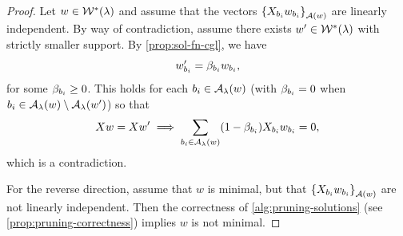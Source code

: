 
\minimalSols*
\begin{proof}
	Let \( w \in \mathcal{W}^*(\lambda) \) and assume that
	the vectors \( \left\{X_{b_i} w_{b_i}\right\}_{\mathcal{A}(w)} \) are linearly independent.
	By way of contradiction, assume there exists \( w' \in \mathcal{W}^*(\lambda) \)
	with strictly smaller support.
	By \cref{prop:sol-fn-cgl}, we have
	\[
		w_{b_i}' = \beta_{b_i} w_{b_i},
	\]
	for some \( \beta_{b_i} \geq 0 \).
	This holds for each \( {b_i} \in {\mathcal{A}_{\lambda}}(w) \)
	(with \( \beta_{b_i} = 0 \) when \( {b_i} \in {\mathcal{A}_{\lambda}}(w) \setminus {\mathcal{A}_{\lambda}}(w') \)) so that
	\[
		X w = X w' \implies \sum_{{b_i} \in {\mathcal{A}_{\lambda}}(w)} (1 - \beta_{b_i}) X_{b_i} w_{b_i} = 0,
	\]
	which is a contradiction.

	For the reverse direction, assume that \( w \) is minimal, but that
	\( \left\{X_{b_i} w_{b_i}\right\}_{\mathcal{A}(w)} \) are not linearly independent.
	Then the correctness of \cref{alg:pruning-solutions}
	(see \cref{prop:pruning-correctness}) implies
	\( w \) is not minimal.
\end{proof}


